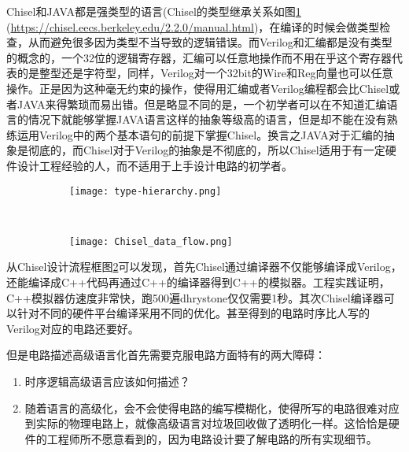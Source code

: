 Chisel和JAVA都是强类型的语言(Chisel的类型继承关系如图\ref{fig:type} (\url{https://chisel.eecs.berkeley.edu/2.2.0/manual.html})，在编译的时候会做类型检查，从而避免很多因为类型不当导致的逻辑错误。而Verilog和汇编都是没有类型的概念的，一个32位的逻辑寄存器，汇编可以任意地操作而不用在乎这个寄存器代表的是整型还是字符型，同样，Verilog对一个32bit的Wire和Reg向量也可以任意操作。正是因为这种毫无约束的操作，使得用汇编或者Verilog编程都会比Chisel或者JAVA来得繁琐而易出错。但是略显不同的是，一个初学者可以在不知道汇编语言的情况下就能够掌握JAVA语言这样的抽象等级高的语言，但是却不能在没有熟练运用Verilog中的两个基本语句的前提下掌握Chisel。换言之JAVA对于汇编的抽象是彻底的，而Chisel对于Verilog的抽象是不彻底的，所以Chisel适用于有一定硬件设计工程经验的人，而不适用于上手设计电路的初学者。
\begin{figure}[!htbp]
	\centering
	\begin{subfigure}[b]{0.35\textwidth}
		\texttt{[image: type-hierarchy.png]}
		\caption{}
		\label{fig:type}
	\end{subfigure}%
	~%
	\begin{subfigure}[b]{0.65\textwidth}
		\texttt{[image: Chisel\_data\_flow.png]}
		\caption{}
		\label{fig:design_flow}
	\end{subfigure}
	\label{fig:chisel_into}
\end{figure}

从Chisel设计流程框图\ref{fig:design_flow}可以发现，首先Chisel通过编译器不仅能够编译成Verilog，还能编译成C++代码再通过C++的编译器得到C++的模拟器。工程实践证明，C++模拟器仿速度非常快，跑500遍dhrystone仅仅需要1秒。其次Chisel编译器可以针对不同的硬件平台编译采用不同的优化。甚至得到的电路时序比人写的Verilog对应的电路还要好。

但是电路描述高级语言化首先需要克服电路方面特有的两大障碍：
\begin{enumerate}[label=(\arabic*)]
	\item 时序逻辑高级语言应该如何描述？
	\item 随着语言的高级化，会不会使得电路的编写模糊化，使得所写的电路很难对应到实际的物理电路上，就像高级语言对垃圾回收做了透明化一样。这恰恰是硬件的工程师所不愿意看到的，因为电路设计要了解电路的所有实现细节。
\end{enumerate}

